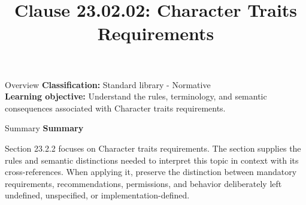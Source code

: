 \documentclass[10pt,letterpaper]{article}
\title{Clause 23.02.02: Character Traits Requirements}
\author{}
\date{}
\begin{document}
\maketitle
\begin{CornellOverviewBox}{Overview}
\textbf{Classification:} Standard library - Normative\\[2pt]
\textbf{Learning objective:} Understand the rules, terminology, and semantic consequences associated with Character traits requirements.
\end{CornellOverviewBox}\begin{CornellSummaryBox}{Summary}
{\sffamily\bfseries\color{Accent} Summary}\par\vspace{3pt}Section 23.2.2 focuses on Character traits requirements. The section supplies the rules and semantic distinctions needed to interpret this topic in context with its cross-references. When applying it, preserve the distinction between mandatory requirements, recommendations, permissions, and behavior deliberately left undefined, unspecified, or implementation-defined.
\end{CornellSummaryBox}
\end{document}

